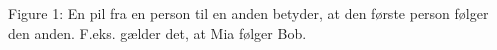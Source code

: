 \documentclass{article}
\begin{document}
\begin{Maple Normal}{
}\end{Maple Normal}
\begin{Maple Normal}{
}\end{Maple Normal}
\begin{Maple Normal}{
}\end{Maple Normal}
\begin{Maple Normal}{
Figure 1: En pil fra en person til en anden betyder, at den første person\linebreak
følger den anden. F.eks. gælder det, at Mia følger Bob.}\end{Maple Normal}
\end{document}
